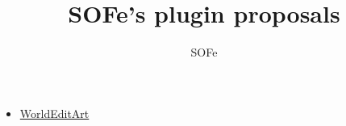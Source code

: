 \documentclass{article}
\title{SOFe's plugin proposals}
\author{SOFe}
\def \prop #1{\item \href{./#1}{#1}}
\begin{document}
	\maketitle
	\begin{itemize}
		\prop{WorldEditArt}
	\end{itemize}
\end{document}
